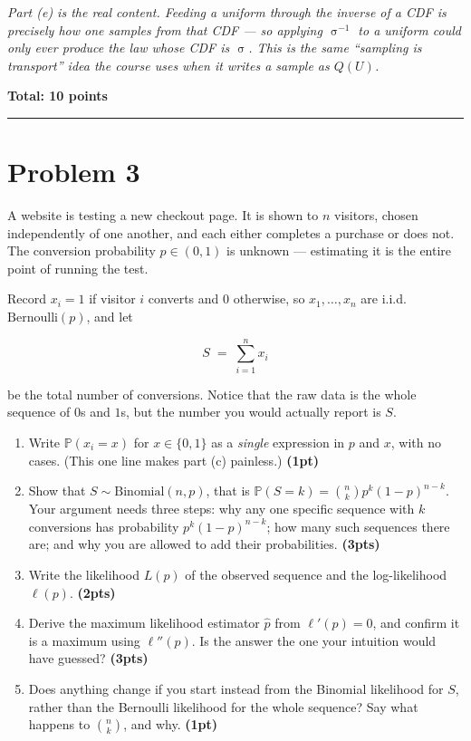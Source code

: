 \documentclass[11pt,a4paper]{article}
\newcommand{\pts}[1]{\hfill\textbf{(#1pts)}}
\newcommand{\pt}[1]{\hfill\textbf{(#1pt)}}
\newcommand{\total}[1]{\par\medskip\noindent\textbf{Total: #1 points}}
\newcommand{\PP}{\mathbb{P}}
\newcommand{\sig}{\operatorname{\sigma}}
\newenvironment{parts}
  {\begin{enumerate}\setlength{\itemsep}{0.45em}\setlength{\parskip}{0pt}}
  {\end{enumerate}}
\begin{document}
\noindent\textit{Part (e) is the real content. Feeding a uniform through the
inverse of a CDF is precisely how one samples from that CDF — so applying
$\sig^{-1}$ to a uniform could only ever produce the law whose CDF is $\sig$.
This is the same ``sampling is transport'' idea the course uses when it writes a
sample as $Q(U)$.}

\total{10}

\bigskip
\hrule
\bigskip

\section*{Problem 3}

A website is testing a new checkout page. It is shown to $n$ visitors, chosen
independently of one another, and each either completes a purchase or does not.
The conversion probability $p \in (0,1)$ is unknown — estimating it is the entire
point of running the test.

Record $x_i = 1$ if visitor $i$ converts and $0$ otherwise, so
$x_1,\dots,x_n$ are i.i.d.\ $\mathrm{Bernoulli}(p)$, and let

\[
  S \;=\; \sum_{i=1}^{n} x_i
\]

be the total number of conversions. Notice that the raw data is the whole
sequence of $0$s and $1$s, but the number you would actually report is $S$.

\begin{parts}
  \item Write $\PP(x_i = x)$ for $x \in \{0,1\}$ as a \emph{single} expression in
        $p$ and $x$, with no cases. (This one line makes part (c) painless.)
        \pt{1}
  \item Show that $S \sim \mathrm{Binomial}(n,p)$, that is
        $\PP(S = k) = \binom{n}{k}p^{k}(1-p)^{n-k}$. Your argument needs three
        steps: why any one specific sequence with $k$ conversions has probability
        $p^{k}(1-p)^{n-k}$; how many such sequences there are; and why you are
        allowed to add their probabilities. \pts{3}
  \item Write the likelihood $L(p)$ of the observed sequence and the
        log-likelihood $\ell(p)$. \pts{2}
  \item Derive the maximum likelihood estimator $\hat p$ from $\ell'(p) = 0$, and
        confirm it is a maximum using $\ell''(p)$. Is the answer the one your
        intuition would have guessed? \pts{3}
  \item Does anything change if you start instead from the Binomial likelihood
        for $S$, rather than the Bernoulli likelihood for the whole sequence?
        Say what happens to $\binom{n}{k}$, and why. \pt{1}
\end{parts}
\end{document}
